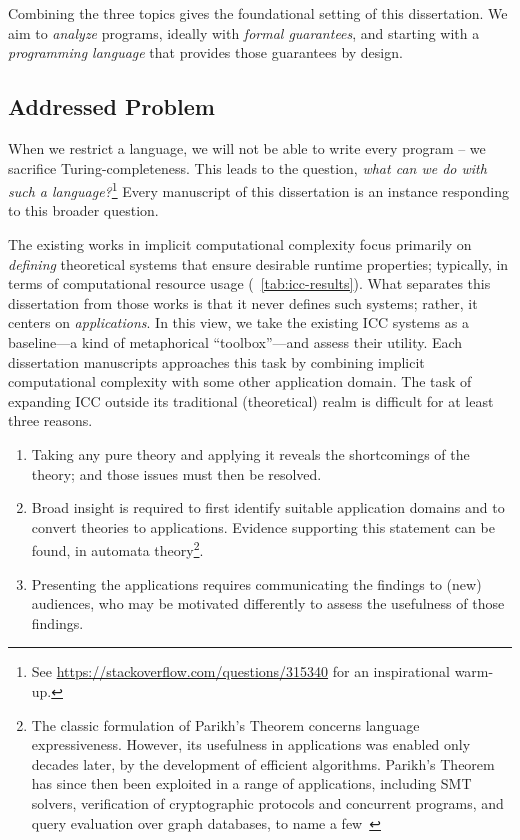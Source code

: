 Combining the three topics gives the foundational setting of this dissertation.
We aim to \emph{analyze} programs, ideally with \emph{formal guarantees}, and starting with a \emph{programming language} that provides those guarantees by design.

\subsection{Addressed Problem}
\label{subsec:problem}

When we restrict a language, we will not be able to write every program -- \ie we sacrifice Turing-completeness.
This leads to the question, \emph{what can we do with such a language?}\footnote{
See \url{https://stackoverflow.com/questions/315340} for an inspirational warm-up.}
Every manuscript of this dissertation is an instance responding to this broader question.

The existing works in implicit computational complexity focus primarily on \emph{defining} theoretical systems that ensure desirable runtime properties;
typically, in terms of computational resource usage (\cf~\autoref{tab:icc-results}).
What separates this dissertation from those works is that it never defines such systems;
rather, it centers on \emph{applications}.
In this view, we take the existing ICC systems as a baseline---a kind of metaphorical \enquote{toolbox}---and assess their utility.
Each dissertation manuscripts approaches this task by combining implicit computational complexity with some other application domain.
The task of expanding ICC outside its traditional (theoretical) realm is difficult for at least three reasons.

\begin{enumerate}

\item Taking any pure theory and applying it reveals the shortcomings of the theory;
      and those issues must then be resolved.

\item Broad insight is required to first identify suitable application domains and to convert theories to applications.
Evidence supporting this statement can be found, \eg in automata theory\footnote{
The classic formulation of Parikh's Theorem concerns language expressiveness.
However, its usefulness in applications was enabled {only decades later}, by the development of efficient algorithms.
Parikh's Theorem has since then been exploited in a range of applications, including SMT solvers, verification of cryptographic protocols and concurrent programs, and query evaluation over graph databases, to name a few~\cite[pg. 2]{hague2024}}.

\item Presenting the applications requires communicating the findings to (new) audiences, who may be motivated differently to assess the {usefulness} of those findings.
\end{enumerate}

